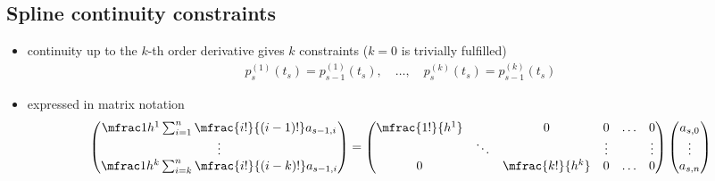 \documentclass[11pt, a4paper]{article}
\begin{document}
\subsection*{Spline continuity constraints}
\begin{itemize}
	\item continuity up to the $k$-th order derivative gives $k$ constraints ($k=0$ is trivially fulfilled)
		\begin{align}
			p_s^{(1)}(t_s)=p_{s-1}^{(1)}(t_s),\quad\ldots,\quad p_s^{(k)}(t_s)=p_{s-1}^{(k)}(t_s)
		\end{align}
	\item expressed in matrix notation
		\begin{align}
			\begin{pmatrix}
				\mfrac1{h^1}\sum_{i=1}^n\mfrac{i!}{(i-1)!}a_{s-1,i}\\
				\vdots\\
				\mfrac1{h^k}\sum_{i=k}^n\mfrac{i!}{(i-k)!}a_{s-1,i}
			\end{pmatrix}
			=\begin{pmatrix}
				\mfrac{1!}{h^1}&&0&0&\ldots&0\\
				&\ddots&&\vdots&&\vdots\\
				0&&\mfrac{k!}{h^k}&0&\ldots&0
			\end{pmatrix}
			\begin{pmatrix}
				a_{s,0}\\
				\vdots\\
				a_{s,n}
			\end{pmatrix}
		\end{align}
\end{itemize}
\end{document}
